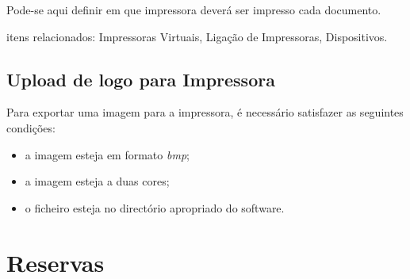 \documentclass[a4paper,11pt,openany]{memoir}
\begin{document}
Pode-se aqui definir em que impressora deverá ser impresso cada documento.

itens relacionados: Impressoras Virtuais, Ligação de Impressoras, Dispositivos.

\section{Upload de logo para Impressora}

Para exportar uma imagem para a impressora, é necessário satisfazer as seguintes condições:
\begin{itemize}
\item a imagem esteja em formato \emph{bmp};
\item a imagem  esteja a duas cores;
\item o ficheiro esteja no directório apropriado do software.
\end{itemize}


\chapter{Reservas}
\end{document}
